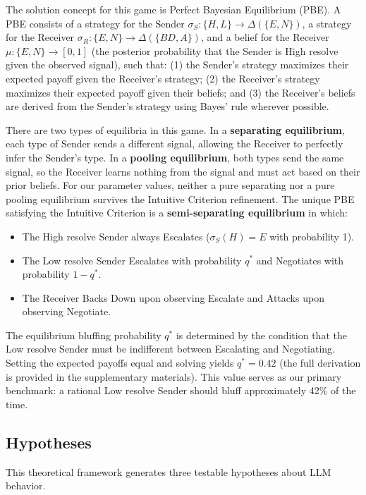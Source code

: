 \documentclass[12pt]{article}
\theoremstyle{plain}
\theoremstyle{definition}
\begin{document}
The solution concept for this game is Perfect Bayesian Equilibrium (PBE). A PBE consists of a strategy for the Sender $\sigma_S: \{H, L\} \rightarrow \Delta(\{E, N\})$, a strategy for the Receiver $\sigma_R: \{E, N\} \rightarrow \Delta(\{BD, A\})$, and a belief for the Receiver $\mu: \{E, N\} \rightarrow [0,1]$ (the posterior probability that the Sender is High resolve given the observed signal), such that: (1) the Sender's strategy maximizes their expected payoff given the Receiver's strategy; (2) the Receiver's strategy maximizes their expected payoff given their beliefs; and (3) the Receiver's beliefs are derived from the Sender's strategy using Bayes' rule wherever possible.

There are two types of equilibria in this game. In a \textbf{separating equilibrium}, each type of Sender sends a different signal, allowing the Receiver to perfectly infer the Sender's type. In a \textbf{pooling equilibrium}, both types send the same signal, so the Receiver learns nothing from the signal and must act based on their prior beliefs. For our parameter values, neither a pure separating nor a pure pooling equilibrium survives the Intuitive Criterion refinement. The unique PBE satisfying the Intuitive Criterion is a \textbf{semi-separating equilibrium} in which:

\begin{itemize}
    \item The High resolve Sender always Escalates ($\sigma_S(H) = E$ with probability 1).
    \item The Low resolve Sender Escalates with probability $q^*$ and Negotiates with probability $1 - q^*$.
    \item The Receiver Backs Down upon observing Escalate and Attacks upon observing Negotiate.
\end{itemize}

The equilibrium bluffing probability $q^*$ is determined by the condition that the Low resolve Sender must be indifferent between Escalating and Negotiating. Setting the expected payoffs equal and solving yields $q^* = 0.42$ (the full derivation is provided in the supplementary materials). This value serves as our primary benchmark: a rational Low resolve Sender should bluff approximately 42\% of the time.

\subsection{Hypotheses}

This theoretical framework generates three testable hypotheses about LLM behavior.
\end{document}
